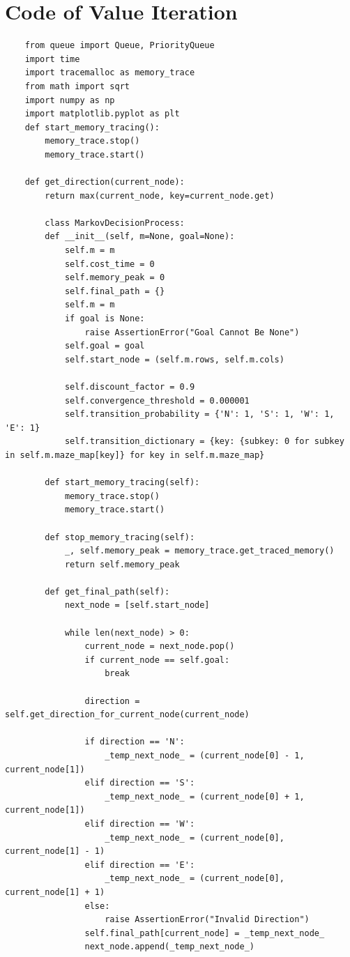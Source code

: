 \documentclass{article}
\begin{document}
\section{Code of Value Iteration}
\begin{lstlisting}
    from queue import Queue, PriorityQueue
    import time
    import tracemalloc as memory_trace
    from math import sqrt
    import numpy as np
    import matplotlib.pyplot as plt
    def start_memory_tracing():
        memory_trace.stop()
        memory_trace.start()

    def get_direction(current_node):
        return max(current_node, key=current_node.get)

        class MarkovDecisionProcess:
        def __init__(self, m=None, goal=None):
            self.m = m
            self.cost_time = 0
            self.memory_peak = 0
            self.final_path = {}
            self.m = m
            if goal is None:
                raise AssertionError("Goal Cannot Be None")
            self.goal = goal
            self.start_node = (self.m.rows, self.m.cols)
    
            self.discount_factor = 0.9
            self.convergence_threshold = 0.000001
            self.transition_probability = {'N': 1, 'S': 1, 'W': 1, 'E': 1}
            self.transition_dictionary = {key: {subkey: 0 for subkey in self.m.maze_map[key]} for key in self.m.maze_map}
    
        def start_memory_tracing(self):
            memory_trace.stop()
            memory_trace.start()
    
        def stop_memory_tracing(self):
            _, self.memory_peak = memory_trace.get_traced_memory()
            return self.memory_peak
    
        def get_final_path(self):
            next_node = [self.start_node]
    
            while len(next_node) > 0:
                current_node = next_node.pop()
                if current_node == self.goal:
                    break
    
                direction = self.get_direction_for_current_node(current_node)
    
                if direction == 'N':
                    _temp_next_node_ = (current_node[0] - 1, current_node[1])
                elif direction == 'S':
                    _temp_next_node_ = (current_node[0] + 1, current_node[1])
                elif direction == 'W':
                    _temp_next_node_ = (current_node[0], current_node[1] - 1)
                elif direction == 'E':
                    _temp_next_node_ = (current_node[0], current_node[1] + 1)
                else:
                    raise AssertionError("Invalid Direction")
                self.final_path[current_node] = _temp_next_node_
                next_node.append(_temp_next_node_)
    

\end{lstlisting}
\end{document}

